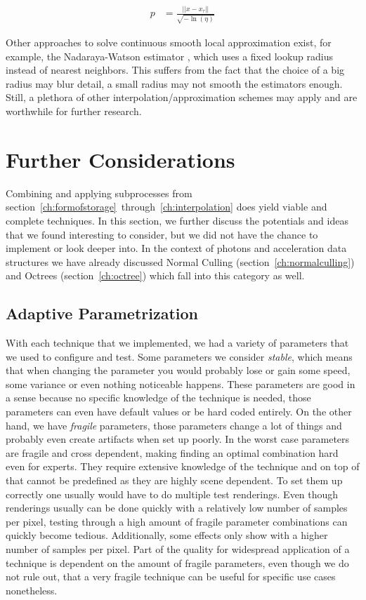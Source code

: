 \begin{align}
p &= \frac{||x-x_\tau||}{\sqrt{-\ln(\eta)}} \label{eq:p0}
\end{align}

Other approaches to solve continuous smooth local approximation exist, for example, the Nadaraya-Watson estimator \parencite{nadaraya1964estimating}, which uses a fixed lookup radius instead of nearest neighbors. This suffers from the fact that the choice of a big radius may blur detail, a small radius may not smooth the estimators enough. Still, a plethora of other interpolation/approximation schemes may apply and are worthwhile for further research.


\section{Further Considerations}
\label{sec:futhercons}
Combining and applying subprocesses from section~\ref{ch:formofstorage}~through~\ref{ch:interpolation} does yield viable and complete techniques. In this section, we further discuss the potentials and ideas that we found interesting to consider, but we did not have the chance to implement or look deeper into. In the context of photons and acceleration data structures we have already discussed Normal Culling (section~\ref{ch:normalculling}) and Octrees (section~\ref{ch:octree}) which fall into this category as well.

\subsection{Adaptive Parametrization}

With each technique that we implemented, we had a variety of parameters that we used to configure and test. Some parameters we consider \textit{stable}, which means that when changing the parameter you would probably lose or gain some speed, some variance or even nothing noticeable happens. These parameters are good in a sense because no specific knowledge of the technique is needed, those parameters can even have default values or be hard coded entirely. On the other hand, we have \textit{fragile} parameters, those parameters change a lot of things and probably even create artifacts when set up poorly. In the worst case parameters are fragile and cross dependent, making finding an optimal combination hard even for experts. They require extensive knowledge of the technique and on top of that cannot be predefined as they are highly scene dependent. To set them up correctly one usually would have to do multiple test renderings. Even though renderings usually can be done quickly with a relatively low number of samples per pixel, testing through a high amount of fragile parameter combinations can quickly become tedious. Additionally, some effects only show with a higher number of samples per pixel. Part of the quality for widespread application of a technique is dependent on the amount of fragile parameters, even though we do not rule out, that a very fragile technique can be useful for specific use cases nonetheless.

